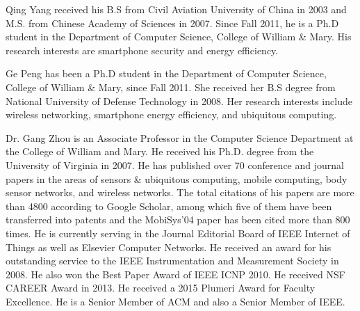 \documentclass[journal]{IEEEtran}
\begin{document}
\begin{IEEEbiography}{Qing Yang} received his B.S from Civil Aviation University of
China in 2003 and M.S. from Chinese Academy of Sciences in 2007. Since
Fall 2011, he is a Ph.D student in the Department of Computer Science,
College of William \& Mary. His research interests are smartphone
security and energy efficiency.
\end{IEEEbiography}

\begin{IEEEbiography}{Ge Peng} has been a Ph.D student in the Department of Computer Science, College of William \& Mary, since  Fall 2011. She received her B.S degree from National University of Defense Technology in 2008. Her research interests include wireless networking, smartphone energy efficiency, and ubiquitous computing.
\end{IEEEbiography}

\begin{IEEEbiography} {Dr. Gang Zhou} is an Associate Professor in the Computer Science Department at the College of William and Mary. He received his Ph.D. degree from the University of Virginia in 2007. He has published over 70 conference and journal papers in the areas of sensors \& ubiquitous computing, mobile computing, body sensor networks, and wireless networks. The total citations of his papers are more than 4800 according to Google Scholar, among which five of them have been transferred into patents and the MobiSys'04 paper has been cited more than 800 times. He is currently serving in the Journal Editorial Board of IEEE Internet of Things as well as Elsevier Computer Networks. He received an award for his outstanding service to the IEEE Instrumentation and Measurement Society in 2008. He also won the Best Paper Award of IEEE ICNP 2010. He received NSF CAREER Award in 2013. He received a 2015 Plumeri Award for Faculty Excellence. He is a Senior Member of ACM and also a Senior Member of IEEE.
\end{IEEEbiography}
\end{document}
